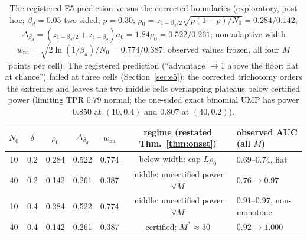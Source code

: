 \begin{table}[t]\centering\footnotesize
\begin{tabular}{ccccccl}
\toprule
$N_0$ & $\delta$ & $\rho_0$ & $\Delta_{\beta_d}$ & $w_{\mathrm{na}}$ &
regime (restated Thm.~\ref{thm:onset}) & observed AUC (all $M$) \\
\midrule
10 & 0.2 & 0.284 & 0.522 & 0.774 & below width: cap $L\rho_0$ & $0.69$--$0.74$, flat \\
40 & 0.2 & 0.142 & 0.261 & 0.387 & middle: uncertified power $\forall M$ & $0.76\to0.97$ \\
10 & 0.4 & 0.284 & 0.522 & 0.774 & middle: uncertified power $\forall M$ & $0.91$--$0.97$, non-monotone \\
40 & 0.4 & 0.142 & 0.261 & 0.387 & certified: $M^{*}\!\approx\!30$ & $0.92\to1.000$ \\
\bottomrule
\end{tabular}
\caption{The registered E5 prediction versus the corrected boundaries
(exploratory, post hoc; $\beta_d=0.05$ two-sided; $p=0.30$;
$\rho_0=z_{1-\beta_d/2}\sqrt{p(1-p)/N_0}=0.284/0.142$;
$\Delta_{\beta_d}=(z_{1-\beta_d/2}+z_{1-\beta_d})\sigma_0=1.84\rho_0=0.522/0.261$;
non-adaptive width $w_{\mathrm{na}}=\sqrt{2\ln(1/\beta_d)/N_0}=0.774/0.387$;
observed values frozen, all four $M$ points per cell). The registered
prediction (``advantage $\to1$ above the floor; flat at chance'') failed
at three cells (Section~\ref{sec:e5}); the corrected trichotomy orders the
extremes and leaves the two middle cells overlapping plateaus below
certified power (limiting TPR $0.79$ normal; the one-sided exact binomial
UMP has power $0.850$ at $(10,0.4)$ and $0.807$ at $(40,0.2)$).}
\label{tab:widths}
\end{table}
